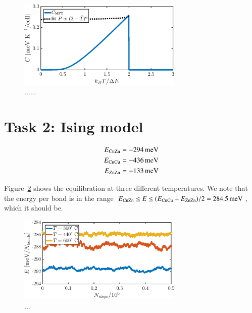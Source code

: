 \begin{figure}[!ht]
\begin{center}
  \includegraphics[width=0.7\textwidth]{../figures/C_MFT} 
  \caption{......}
  \label{fig:T1:C}
\end{center}
\end{figure}

\section*{Task 2: Ising model}
\begin{align}
E_{\rm CuZn} &= \unit[-294]{meV} \\
E_{\rm CuCu} &= \unit[-436]{meV} \\
E_{\rm ZnZn} &= \unit[-133]{meV} \\
\end{align}

Figure~\ref{fig:T2:equil} shows the equilibration at three different temperatures. We note that the energy per bond is in the range $E_{\rm CuZn} \leq E \leq (E_{\rm CuCu} + E_{\rm ZnZn})/2 = \unit[284.5]{meV}$, which it should be. 

\begin{figure}[!ht]
\begin{center}
  \includegraphics[width=0.7\textwidth]{../figures/equilibration} 
  \caption{... }
  \label{fig:T2:equil}
\end{center}
\end{figure}


